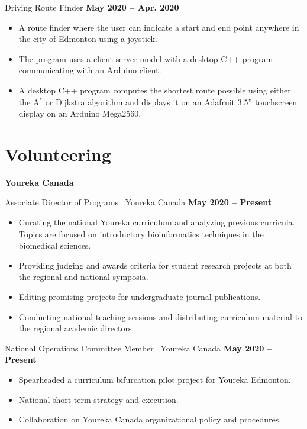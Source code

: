 \documentclass{article}
\begin{document}
    Driving Route Finder \hfill \textbf{May 2020 -- Apr. 2020}
    \begin{itemize}
        \item A route finder where the user can indicate a start and end point anywhere in the city of Edmonton using a joystick.
        \item The program uses a client-server model with a desktop C++ program communicating with an Arduino client.
        \item A desktop C++ program computes the shortest route possible using either the A$^*$ or Dijkstra algorithm and displays it on an Adafruit 3.5'' touchscreen display on an Arduino Mega2560.
    \end{itemize}


\section*{Volunteering}
    \textbf{Youreka Canada}

    Associate Director of Programs \textbar\ Youreka Canada \hfill \textbf{May 2020 -- Present}
    \begin{itemize}
        \item Curating the national Youreka curriculum and analyzing previous curricula. Topics are focused on introductory bioinformatics techniques in the biomedical sciences.
        \item Providing judging and awards criteria for student research projects at both the regional and national symposia.
        \item Editing promising projects for undergraduate journal publications.
        \item Conducting national teaching sessions and distributing curriculum material to the regional academic directors.
    \end{itemize}

    National Operations Committee Member \textbar\ Youreka Canada \hfill \textbf{May 2020 -- Present}
    \begin{itemize}
        \item Spearheaded a curriculum bifurcation pilot project for Youreka Edmonton.
        \item National short-term strategy and execution.
        \item Collaboration on Youreka Canada organizational policy and procedures.
    \end{itemize}
\end{document}
